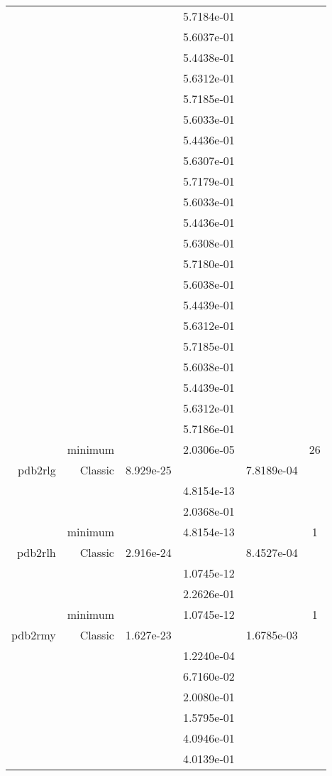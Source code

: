 \begin{xltabular}{\textwidth}{r|rS[table-format=1.3e+2]S[table-format=1.4e+2]S[table-format=1.4e+2]S[table-format=-1.5]}
&  &  & 5.7184e-01 & & \\
&  &  & 5.6037e-01 & & \\
&  &  & 5.4438e-01 & & \\
&  &  & 5.6312e-01 & & \\
&  &  & 5.7185e-01 & & \\
&  &  & 5.6033e-01 & & \\
&  &  & 5.4436e-01 & & \\
&  &  & 5.6307e-01 & & \\
&  &  & 5.7179e-01 & & \\
&  &  & 5.6033e-01 & & \\
&  &  & 5.4436e-01 & & \\
&  &  & 5.6308e-01 & & \\
&  &  & 5.7180e-01 & & \\
&  &  & 5.6038e-01 & & \\
&  &  & 5.4439e-01 & & \\
&  &  & 5.6312e-01 & & \\
&  &  & 5.7185e-01 & & \\
&  &  & 5.6038e-01 & & \\
&  &  & 5.4439e-01 & & \\
&  &  & 5.6312e-01 & & \\
&  &  & 5.7186e-01 & & \\
& minimum &  & 2.0306e-05 & & 26 \\  \addlinespace
pdb2rlg & Classic & 8.929e-25 &  & 7.8189e-04 & \\
&  &  & 4.8154e-13 & & \\
&  &  & 2.0368e-01 & & \\
& minimum &  & 4.8154e-13 & & 1 \\  \addlinespace
pdb2rlh & Classic & 2.916e-24 &  & 8.4527e-04 & \\
&  &  & 1.0745e-12 & & \\
&  &  & 2.2626e-01 & & \\
& minimum &  & 1.0745e-12 & & 1 \\  \addlinespace
pdb2rmy & Classic & 1.627e-23 &  & 1.6785e-03 & \\
&  &  & 1.2240e-04 & & \\
&  &  & 6.7160e-02 & & \\
&  &  & 2.0080e-01 & & \\
&  &  & 1.5795e-01 & & \\
&  &  & 4.0946e-01 & & \\
&  &  & 4.0139e-01 & & \\

\end{xltabular}
